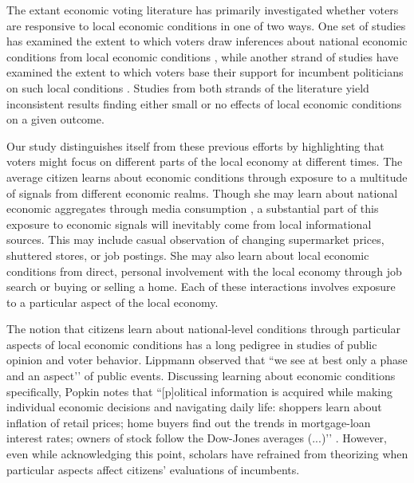 \documentclass[12pt,a4paper]{article}
\begin{document}
	The extant economic voting literature has primarily investigated whether voters are responsive to local economic conditions in one of two ways. One set of studies has examined the extent to which voters draw inferences about national economic conditions from local economic conditions \citep{books1999contextual,reeves2012ecologies,anderson2011local,ansolabehere2014mecro,bisgaard2016reconsidering}, while another strand of studies have examined the extent to which voters base their support for incumbent politicians on such local conditions \citep{hansford2015reevaluating,eisenberg2004economic,kim2003spatial,healy2017presidential, auberger2005influence,wright2012unemployment}. Studies from both strands of the literature yield inconsistent results finding either small or no effects of local economic conditions on a given outcome.   
	
	Our study distinguishes itself from these previous efforts by highlighting that voters might focus on different parts of the local economy at different times. The average citizen learns about economic conditions through exposure to a multitude of signals from different economic realms. Though she may learn about national economic aggregates through media consumption \citep{soroka2015s}, a substantial part of this exposure to economic signals will inevitably come from local informational sources. This may include casual observation of changing supermarket prices, shuttered stores, or job postings. She may also learn about local economic conditions from direct, personal involvement with the local economy through job search or buying or selling a home. Each of these interactions involves exposure to a particular aspect of the local economy.
	
	The notion that citizens learn about national-level conditions through particular aspects of local economic conditions has a long pedigree in studies of public opinion and voter behavior. Lippmann \citeyearpar[][p. 79]{lippmann1946public} observed that ``we see at best only a phase and an aspect’’ of public events. Discussing learning about economic conditions specifically, Popkin \citeyearpar[][p. 24]{popkin1994reasoning} notes that ``[p]olitical information is acquired while making individual economic decisions and navigating daily life: shoppers learn about inflation of retail prices; home buyers find out the trends in mortgage-loan interest rates; owners of stock follow the Dow-Jones averages (...)’’ \cite[see also][p. 5]{fiorina1981retrospective}. However, even while acknowledging this point, scholars have refrained from theorizing when particular aspects affect citizens’ evaluations of incumbents. 
	
\end{document}

